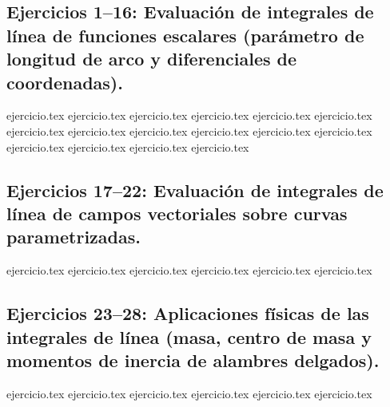 
\subsection*{Ejercicios 1--16: Evaluación de integrales de línea de funciones escalares (parámetro de longitud de arco y diferenciales de coordenadas).}
\begin{enumerate}
    {ejercicio.tex}
    {ejercicio.tex}
    {ejercicio.tex}
    {ejercicio.tex}
    {ejercicio.tex}
    {ejercicio.tex}
    {ejercicio.tex}
    {ejercicio.tex}
    {ejercicio.tex}
    {ejercicio.tex}
    {ejercicio.tex}
    {ejercicio.tex}
    {ejercicio.tex}
    {ejercicio.tex}
    {ejercicio.tex}
    {ejercicio.tex}
\end{enumerate}

\subsection*{Ejercicios 17--22: Evaluación de integrales de línea de campos vectoriales sobre curvas parametrizadas.}
\begin{enumerate}
    \setcounter{enumi}{16}
    {ejercicio.tex}
    {ejercicio.tex}
    {ejercicio.tex}
    {ejercicio.tex}
    {ejercicio.tex}
    {ejercicio.tex}
\end{enumerate}

\subsection*{Ejercicios 23--28: Aplicaciones físicas de las integrales de línea (masa, centro de masa y momentos de inercia de alambres delgados).}
\begin{enumerate}
    \setcounter{enumi}{22}
    {ejercicio.tex}
    {ejercicio.tex}
    {ejercicio.tex}
    {ejercicio.tex}
    {ejercicio.tex}
    {ejercicio.tex}
\end{enumerate}

